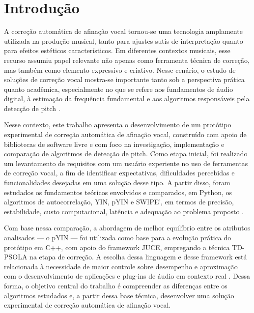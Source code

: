 \chapter{\label{chap:intro}Introdução}

A correção automática de afinação vocal tornou-se uma tecnologia amplamente utilizada na produção musical, tanto para ajustes sutis de interpretação quanto para efeitos estéticos característicos. Em diferentes contextos musicais, esse recurso assumiu papel relevante não apenas como ferramenta técnica de correção, mas também como elemento expressivo e criativo. Nesse cenário, o estudo de soluções de correção vocal mostra-se importante tanto sob a perspectiva prática quanto acadêmica, especialmente no que se refere aos fundamentos de áudio digital, à estimação da frequência fundamental e aos algoritmos responsáveis pela detecção de pitch \cite{antares_autotune_pro,antares_autotune_manual,decheveigne2002yin,mauch2014pyin}.

Nesse contexto, este trabalho apresenta o desenvolvimento de um protótipo experimental de correção automática de afinação vocal, construído com apoio de bibliotecas de software livre e com foco na investigação, implementação e comparação de algoritmos de detecção de pitch. Como etapa inicial, foi realizado um levantamento de requisitos com um usuário experiente no uso de ferramentas de correção vocal, a fim de identificar expectativas, dificuldades percebidas e funcionalidades desejadas em uma solução desse tipo. A partir disso, foram estudados os fundamentos teóricos envolvidos e comparados, em Python, os algoritmos de autocorrelação, YIN, pYIN e SWIPE', em termos de precisão, estabilidade, custo computacional, latência e adequação ao problema proposto \cite{decheveigne2002yin,mauch2014pyin,delacuadra2007pitch,camacho2008swipe}.

Com base nessa comparação, a abordagem de melhor equilíbrio entre os atributos analisados --- o pYIN --- foi utilizada como base para a evolução prática do protótipo em C++, com apoio do framework JUCE, empregando a técnica TD-PSOLA na etapa de correção. A escolha dessa linguagem e desse framework está relacionada à necessidade de maior controle sobre desempenho e aproximação com o desenvolvimento de aplicações e plug-ins de áudio em contexto real \cite{cppreference_cpp,juce_website,juce_github}. Dessa forma, o objetivo central do trabalho é compreender as diferenças entre os algoritmos estudados e, a partir dessa base técnica, desenvolver uma solução experimental de correção automática de afinação vocal.

